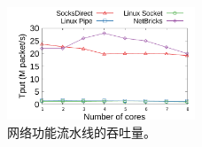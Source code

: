 \begin{figure}[htbp]
	\centering
	\includegraphics[width=0.5\textwidth]{eval/microbenchmark/nfv-tun-tput.pdf}
	
	\caption{网络功能流水线的吞吐量。}
	\label{socksdirect:fig:eval-tun-tput}
	
	
\end{figure}



